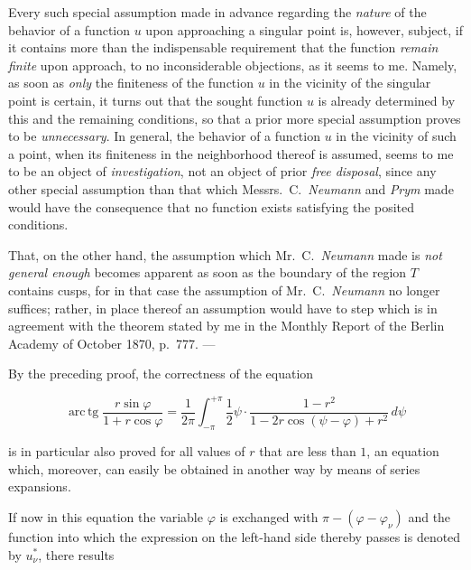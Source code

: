 \documentclass{article}
\begin{document}
Every such special assumption made in advance regarding the \emph{nature} of the behavior of a function $u$ upon approaching a singular point is, however, subject, if it contains more than the indispensable requirement that the function \emph{remain finite} upon approach, to no inconsiderable objections, as it seems to me. Namely, as soon as \emph{only} the finiteness of the function $u$ in the vicinity of the singular point is certain, it turns out that the sought function $u$ is already determined by this and the remaining conditions, so that a prior more special assumption proves to be \emph{unnecessary}. In general, the behavior of a function $u$ in the vicinity of such a point, when its finiteness in the neighborhood thereof is assumed, seems to me to be an object of \emph{investigation}, not an object of prior \emph{free disposal}, since any other special assumption than that which Messrs.~C.~\emph{Neumann} and \emph{Prym} made would have the consequence that no function exists satisfying the posited conditions.



That, on the other hand, the assumption which Mr.~C.~\emph{Neumann} made is \emph{not general enough} becomes apparent as soon as the boundary of the region $T$ contains cusps, for in that case the assumption of Mr.~C.~\emph{Neumann} no longer suffices; rather, in place thereof an assumption would have to step which is in agreement with the theorem stated by me in the Monthly Report of the Berlin Academy of October 1870, p.~777. ---



By the preceding proof, the correctness of the equation

\[

\operatorname{arc\,tg}\frac{r\sin\varphi}{1 + r\cos\varphi} = \frac{1}{2\pi} \int_{-\pi}^{+\pi} \frac{1}{2}\psi \cdot \frac{1 - r^2}{1 - 2r \cos(\psi - \varphi) + r^2}\,d\psi

\]

is in particular also proved for all values of $r$ that are less than $1$, an equation which, moreover, can easily be obtained in another way by means of series expansions.



If now in this equation the variable $\varphi$ is exchanged with $\pi - (\varphi - \varphi_\nu)$ and the function into which the expression on the left-hand side thereby passes is denoted by $u_\nu^*$, there results
\end{document}
